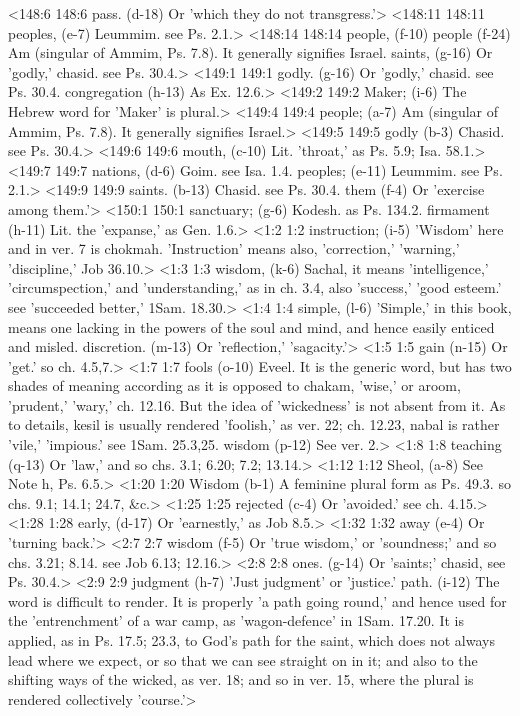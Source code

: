 <148:6 148:6  pass. (d-18)  Or 'which they do not transgress.'>
<148:11 148:11  peoples, (e-7)  Leummim. see Ps. 2.1.>
<148:14 148:14  people, (f-10)  people (f-24)
  Am (singular of Ammim, Ps. 7.8). It generally signifies  Israel.
  saints, (g-16)  Or 'godly,' chasid. see Ps. 30.4.>
<149:1 149:1  godly. (g-16)  Or 'godly,' chasid. see Ps. 30.4.
  congregation (h-13)  As Ex. 12.6.>
<149:2 149:2  Maker; (i-6)  The Hebrew word for 'Maker' is plural.>
<149:4 149:4  people; (a-7)  Am (singular of Ammim, Ps. 7.8). It generally signifies  Israel.>
<149:5 149:5  godly (b-3)  Chasid. see Ps. 30.4.>
<149:6 149:6  mouth, (c-10)  Lit. 'throat,' as Ps. 5.9; Isa. 58.1.>
<149:7 149:7  nations, (d-6)  Goim. see Isa. 1.4.
  peoples; (e-11)  Leummim. see Ps. 2.1.>
<149:9 149:9  saints. (b-13)  Chasid. see Ps. 30.4.
  them (f-4)  Or 'exercise among them.'>
<150:1 150:1  sanctuary; (g-6)  Kodesh. as Ps. 134.2.
  firmament (h-11)  Lit. the 'expanse,' as Gen. 1.6.>
<1:2 1:2  instruction; (i-5)  'Wisdom' here and in ver. 7 is chokmah. 'Instruction' means  also, 'correction,' 'warning,' 'discipline,' Job 36.10.>
<1:3 1:3  wisdom, (k-6)  Sachal, it means 'intelligence,' 'circumspection,' and  'understanding,' as in ch. 3.4, also 'success,' 'good esteem.'  see 'succeeded better,' 1Sam. 18.30.>
<1:4 1:4  simple, (l-6)  'Simple,' in this book, means one lacking in the powers of  the soul and mind, and hence easily enticed and misled.
  discretion. (m-13)  Or 'reflection,' 'sagacity.'>
<1:5 1:5  gain (n-15)  Or 'get.' so ch. 4.5,7.>
<1:7 1:7  fools (o-10)  Eveel. It is the generic word, but has two shades of  meaning according as it is opposed to chakam, 'wise,' or  aroom, 'prudent,' 'wary,' ch. 12.16. But the idea of  'wickedness' is not absent from it. As to details, kesil is  usually rendered 'foolish,' as ver. 22; ch. 12.23, nabal is  rather 'vile,' 'impious.' see 1Sam. 25.3,25.
  wisdom (p-12)  See ver. 2.>
<1:8 1:8  teaching (q-13)  Or 'law,' and so chs. 3.1; 6.20; 7.2; 13.14.>
<1:12 1:12  Sheol, (a-8)  See Note h, Ps. 6.5.>
<1:20 1:20  Wisdom (b-1)  A feminine plural form as Ps. 49.3. so chs. 9.1; 14.1; 24.7,  &c.>
<1:25 1:25  rejected (c-4)  Or 'avoided.' see ch. 4.15.>
<1:28 1:28  early, (d-17)  Or 'earnestly,' as Job 8.5.>
<1:32 1:32  away (e-4)  Or 'turning back.'>
<2:7 2:7  wisdom (f-5)  Or 'true wisdom,' or 'soundness;' and so chs. 3.21; 8.14. see  Job 6.13; 12.16.>
<2:8 2:8  ones. (g-14)  Or 'saints;' chasid, see Ps. 30.4.>
<2:9 2:9  judgment (h-7)  'Just judgment' or 'justice.'
  path. (i-12)  The word is difficult to render. It is properly 'a path going  round,' and hence used for the 'entrenchment' of a war camp, as  'wagon-defence' in 1Sam. 17.20. It is applied, as in Ps. 17.5;  23.3, to God's path for the saint, which does not always lead  where we expect, or so that we can see straight on in it; and  also to the shifting ways of the wicked, as ver. 18; and so in  ver. 15, where the plural is rendered collectively 'course.'>
